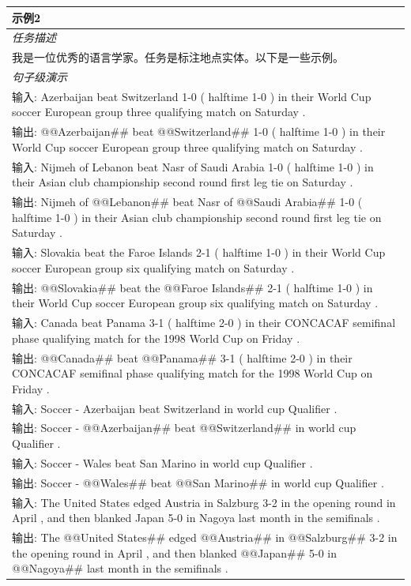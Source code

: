 \documentclass[supercite]{Experimental_Report}
\theoremstyle{definition}
\begin{document}
\begin{table}[th!]
{\begin{tabular}{l}
\textbf{示例2} \\\midrule
       	\textit{任务描述} \\
我是一位优秀的语言学家。任务是标注地点实体。以下是一些示例。 \\\midrule
\textit{句子级演示} \\
输入: Azerbaijan beat Switzerland 1-0 ( halftime 1-0 ) in their World Cup soccer European group three qualifying match on Saturday . \\
输出: @@Azerbaijan\#\# beat @@Switzerland\#\# 1-0 ( halftime 1-0 ) in their World Cup soccer European group three qualifying match on Saturday . \\
输入: Nijmeh of Lebanon beat Nasr of Saudi Arabia 1-0 ( halftime 1-0 ) in their Asian club championship second round first leg tie on Saturday . \\
输出: Nijmeh of @@Lebanon\#\# beat Nasr of @@Saudi Arabia\#\# 1-0 ( halftime 1-0 ) in their Asian club championship second round first leg tie on Saturday . \\
输入: Slovakia beat the Faroe Islands 2-1 ( halftime 1-0 ) in their World Cup soccer European group six qualifying match on Saturday . \\
输出: @@Slovakia\#\# beat the @@Faroe Islands\#\# 2-1 ( halftime 1-0 ) in their World Cup soccer European group six qualifying match on Saturday . \\
输入: Canada beat Panama 3-1 ( halftime 2-0 ) in their CONCACAF semifinal phase qualifying match for the 1998 World Cup on Friday . \\
输出: @@Canada\#\# beat @@Panama\#\# 3-1 ( halftime 2-0 ) in their CONCACAF semifinal phase qualifying match for the 1998 World Cup on Friday . \\
输入: Soccer - Azerbaijan beat Switzerland in world cup Qualifier . \\
输出: Soccer - @@Azerbaijan\#\# beat @@Switzerland\#\# in world cup Qualifier . \\
输入: Soccer - Wales beat San Marino in world cup Qualifier . \\
输出: Soccer - @@Wales\#\# beat @@San Marino\#\# in world cup Qualifier . \\
输入: The United States edged Austria in Salzburg 3-2 in the opening round in April , and then blanked Japan 5-0 in Nagoya last month in the semifinals . \\
输出: The @@United States\#\# edged @@Austria\#\# in @@Salzburg\#\# 3-2 in the opening round in April , and then blanked @@Japan\#\# 5-0 in @@Nagoya\#\# last month in the semifinals . \\

\end{tabular}}
\end{table}
\end{document}
